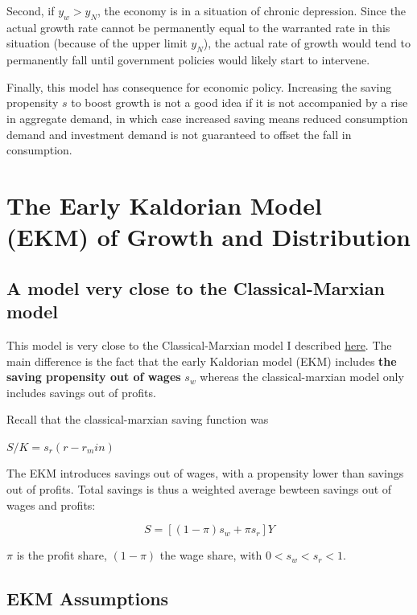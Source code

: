 \documentclass[
  letterpaper,
  DIV=11,
  numbers=noendperiod]{scrreprt}
\begin{document}
Second, if \(y_w>y_N\), the economy is in a situation of chronic
depression. Since the actual growth rate cannot be permanently equal to
the warranted rate in this situation (because of the upper limit
\(y_N\)), the actual rate of growth would tend to permanently fall until
government policies would likely start to intervene.

Finally, this model has consequence for economic policy. Increasing the
saving propensity \(s\) to boost growth is not a good idea if it is not
accompanied by a rise in aggregate demand, in which case increased
saving means reduced consumption demand and investment demand is not
guaranteed to offset the fall in consumption.

\hypertarget{the-early-kaldorian-model-ekm-of-growth-and-distribution}{%
\section{The Early Kaldorian Model (EKM) of Growth and
Distribution}\label{the-early-kaldorian-model-ekm-of-growth-and-distribution}}

\hypertarget{a-model-very-close-to-the-classical-marxian-model}{%
\subsection{A model very close to the Classical-Marxian
model}\label{a-model-very-close-to-the-classical-marxian-model}}

This model is very close to the Classical-Marxian model I described
\href{https://jeylal.github.io/myblog/economics_series/classical-marxian\%20model/classical-marxian\%20model.html}{here}.
The main difference is the fact that the early Kaldorian model (EKM)
includes \textbf{the saving propensity out of wages} \(s_w\) whereas the
classical-marxian model only includes savings out of profits.

Recall that the classical-marxian saving function was

\(S/K= s_r(r-r_min)\)

The EKM introduces savings out of wages, with a propensity lower than
savings out of profits. Total savings is thus a weighted average bewteen
savings out of wages and profits:

\[S = [(1-\pi)s_w+\pi s_r]Y\]

\(\pi\) is the profit share, \((1-\pi)\) the wage share, with
\(0<s_w < s_r<1\).

\hypertarget{ekm-assumptions}{%
\subsection{EKM Assumptions}\label{ekm-assumptions}}
\end{document}
